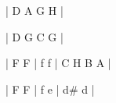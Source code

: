     | D A G H |
    
    | D G C G | 
    
    \zr
    | F F | f  f | C H B A |
    
    | F F | f  e | d\# d |
    \kr
\fi

\kp





